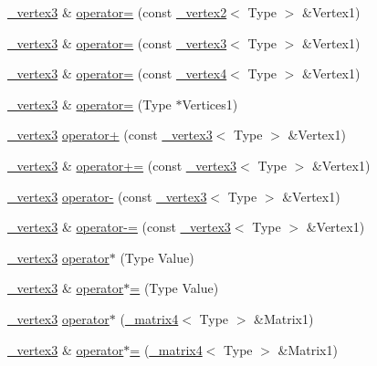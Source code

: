 \begin{DoxyCompactItemize}
\hyperlink{class__vertex3}{\+\_\+vertex3} \& \hyperlink{class__vertex3_a02b38dfaa5efa7ea1c33d889999a4963}{operator=} (const \hyperlink{class__vertex2}{\+\_\+vertex2}$<$ Type $>$ \&Vertex1)
\item 
\hyperlink{class__vertex3}{\+\_\+vertex3} \& \hyperlink{class__vertex3_aa24eb49bfd404dc38866713d62ba1d60}{operator=} (const \hyperlink{class__vertex3}{\+\_\+vertex3}$<$ Type $>$ \&Vertex1)
\item 
\hyperlink{class__vertex3}{\+\_\+vertex3} \& \hyperlink{class__vertex3_a1d85a85c12a1ac50031fabc7b1b35913}{operator=} (const \hyperlink{class__vertex4}{\+\_\+vertex4}$<$ Type $>$ \&Vertex1)
\item 
\hyperlink{class__vertex3}{\+\_\+vertex3} \& \hyperlink{class__vertex3_a5a355a403177fd9e6fddcad967d41f86}{operator=} (Type $\ast$Vertices1)
\item 
\hyperlink{class__vertex3}{\+\_\+vertex3} \hyperlink{class__vertex3_a232e45a10b4260ba71913ecf49a86b0a}{operator+} (const \hyperlink{class__vertex3}{\+\_\+vertex3}$<$ Type $>$ \&Vertex1)
\item 
\hyperlink{class__vertex3}{\+\_\+vertex3} \& \hyperlink{class__vertex3_a7a5e5c8c529ee5091958e91fcf3d7ec0}{operator+=} (const \hyperlink{class__vertex3}{\+\_\+vertex3}$<$ Type $>$ \&Vertex1)
\item 
\hyperlink{class__vertex3}{\+\_\+vertex3} \hyperlink{class__vertex3_a14a90951e1f1532d3ba1602d30c34e98}{operator-\/} (const \hyperlink{class__vertex3}{\+\_\+vertex3}$<$ Type $>$ \&Vertex1)
\item 
\hyperlink{class__vertex3}{\+\_\+vertex3} \& \hyperlink{class__vertex3_a8155a77e45a7939ca0ad8af057bca9ce}{operator-\/=} (const \hyperlink{class__vertex3}{\+\_\+vertex3}$<$ Type $>$ \&Vertex1)
\item 
\hyperlink{class__vertex3}{\+\_\+vertex3} \hyperlink{class__vertex3_a3990828409f315f57ac6ae624e1afe7b}{operator$\ast$} (Type Value)
\item 
\hyperlink{class__vertex3}{\+\_\+vertex3} \& \hyperlink{class__vertex3_a01453dffb2077425457fb1bdd8fd4be9}{operator$\ast$=} (Type Value)
\item 
\hyperlink{class__vertex3}{\+\_\+vertex3} \hyperlink{class__vertex3_ae927a28034a2dab67a01dc3b86a62c71}{operator$\ast$} (\hyperlink{class__matrix4}{\+\_\+matrix4}$<$ Type $>$ \&Matrix1)
\item 
\hyperlink{class__vertex3}{\+\_\+vertex3} \& \hyperlink{class__vertex3_a832ba6fe7b6c217bc64b2dacaf9a8856}{operator$\ast$=} (\hyperlink{class__matrix4}{\+\_\+matrix4}$<$ Type $>$ \&Matrix1)

\end{DoxyCompactItemize}
